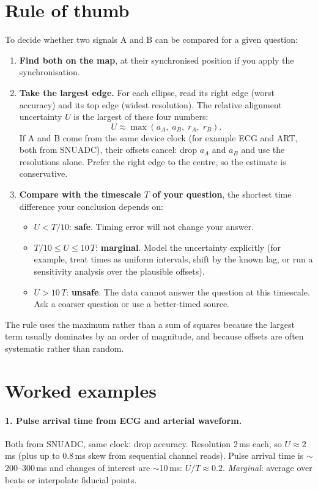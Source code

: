 \documentclass[11pt,a4paper]{article}
\begin{document}
\section{Rule of thumb}\label{sec:rule}
To decide whether two signals A and B can be compared for a given question:
\begin{enumerate}
\item \textbf{Find both on the map}, at their synchronised position if you apply the synchronisation.
\item \textbf{Take the largest edge.} For each ellipse, read its right edge (worst accuracy) and its top edge
(widest resolution). The relative alignment uncertainty $U$ is the largest of these four numbers:
\[
U \approx \max\left(a_A,\; a_B,\; r_A,\; r_B\right).
\]
If A and B come from the same device clock (for example ECG and ART, both from SNUADC), their offsets cancel:
drop $a_A$ and $a_B$ and use the resolutions alone. Prefer the right edge to the centre, so the estimate is
conservative.
\item \textbf{Compare with the timescale $T$ of your question}, the shortest time difference your conclusion depends
on:
\begin{itemize}
\item $U < T/10$: \textbf{safe}. Timing error will not change your answer.
\item $T/10 \le U \le 10\,T$: \textbf{marginal}. Model the uncertainty explicitly (for example, treat times as
uniform intervals, shift by the known lag, or run a sensitivity analysis over the plausible offsets).
\item $U > 10\,T$: \textbf{unsafe}. The data cannot answer the question at this timescale. Ask a coarser
question or use a better-timed source.
\end{itemize}
\end{enumerate}
The rule uses the maximum rather than a sum of squares because the largest term usually dominates by an order of
magnitude, and because offsets are often systematic rather than random.

\section{Worked examples}
\paragraph{1. Pulse arrival time from ECG and arterial waveform.}
Both from SNUADC, same clock: drop accuracy. Resolution 2\,ms each, so $U\approx 2$\,ms (plus up to 0.8\,ms skew
from sequential channel reads). Pulse arrival time is $\sim$200--300\,ms and changes of interest are $\sim$10\,ms:
$U/T \approx 0.2$. \emph{Marginal}: average over beats or interpolate fiducial points.
\end{document}
